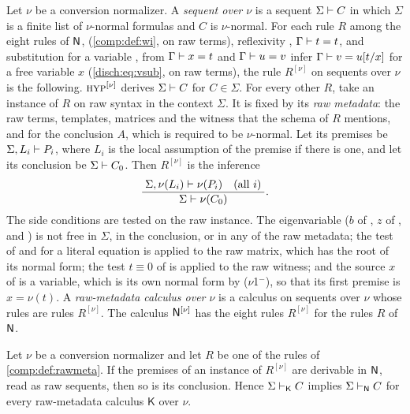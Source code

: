 \begin{definition}
\label{comp:def:rawmeta}
Let $\nu$ be a conversion normalizer. A \emph{sequent over $\nu$} is a
sequent $\Sigma\vdash C$ in which $\Sigma$ is a finite list of $\nu$-normal
formulas and $C$ is $\nu$-normal. For each rule $R$ among the eight rules of
$\mathsf{N}$,  (\cref{comp:def:wi}, on raw terms), reflexivity
, $\Gamma\vdash t=t$, and substitution for a variable
, from $\Gamma\vdash x=t$ and $\Gamma\vdash u=v$ infer
$\Gamma\vdash v=u[t/x]$ for a free variable $x$
(\cref{disch:eq:vsub}, on raw terms), the rule $R^{[\nu]}$ on sequents over
$\nu$ is the following. $\rulename{Hyp}^{[\nu]}$
derives $\Sigma\vdash C$ for $C\in\Sigma$. For every other $R$, take an
instance of $R$ on raw syntax in the context $\Sigma$. It is fixed by its
\emph{raw metadata}: the raw terms, templates, matrices and the witness that
the schema of $R$ mentions, and for  the conclusion $A$, which is
required to be $\nu$-normal. Let its premises be $\Sigma,L_i\vdash P_i$,
where $L_i$ is the local assumption of the premise if there is one, and let
its conclusion be $\Sigma\vdash C_0$. Then $R^{[\nu]}$ is the inference
\[
 \dfrac{\;\Sigma,\nu(L_i)\vdash\nu(P_i)\quad(\text{all }i)\;}{\;\Sigma\vdash\nu(C_0)\;}.
\]
The side conditions are tested on the raw instance. The eigenvariable ($b$
of , $z$ of ,  and ) is
not free in $\Sigma$, in the conclusion, or in any of the raw metadata; the
test of  and  for a literal equation is applied to
the raw matrix, which has the root of its normal form; the test
$t\equiv0$ of  is applied to the raw witness; and the source
$x$ of  is a variable, which is its own normal form by
($\nu$1$^{-}$), so that its first premise is $x=\nu(t)$. A \emph{raw-metadata
calculus over $\nu$} is a calculus on sequents over $\nu$ whose rules are
rules $R^{[\nu]}$. The calculus $\mathsf{N}^{[\nu]}$ has the eight rules
$R^{[\nu]}$ for the rules $R$ of $\mathsf{N}$.
\end{definition}

\begin{lemma}
\label{comp:lem:rawsound}
Let $\nu$ be a conversion normalizer and let $R$ be one of the rules of
\cref{comp:def:rawmeta}. If the premises of an instance of $R^{[\nu]}$ are
derivable in $\mathsf{N}$, read as raw sequents, then so is its conclusion. Hence
$\Sigma\vdash_{\mathsf K}C$ implies $\Sigma\vdash_{\mathsf{N}}C$ for every
raw-metadata calculus $\mathsf K$ over $\nu$.
\end{lemma}

